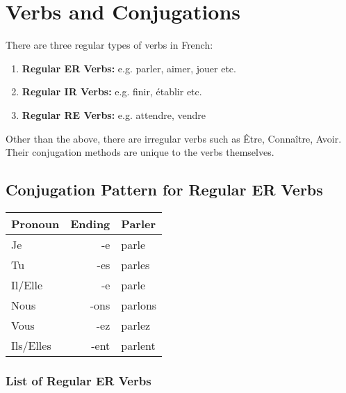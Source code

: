 \section{Verbs and Conjugations}

There are three regular types of verbs in French:
\begin{enumerate}
\item{\textbf{Regular ER Verbs:} e.g. parler, aimer, jouer etc.}
\item{\textbf{Regular IR Verbs:} e.g. finir, \'etablir etc.}
\item{\textbf{Regular RE Verbs:} e.g. attendre, vendre}
\end{enumerate}
Other than the above, there are irregular verbs such as \^Etre, Conna\^itre, Avoir.
Their conjugation methods are unique to the verbs themselves. 

\subsection{Conjugation Pattern for Regular ER Verbs}

\begin{table}[h]
\centering
\begin{tabular}{| l | r | l |}
\hline
Pronoun 	& 	Ending 	& 	Parler	\\ 	\hline
Je			&	-e		& 	parle	\\ 	\hline
Tu			&	-es		&	parles	\\	\hline
Il/Elle		&	-e		&	parle	\\	\hline
Nous		&	-ons	&	parlons	\\	\hline
Vous		&	-ez		&	parlez	\\	\hline
Ils/Elles	&	-ent	&	parlent	\\	\hline
\end{tabular}
\end{table}

\subsubsection{List of Regular ER Verbs}

